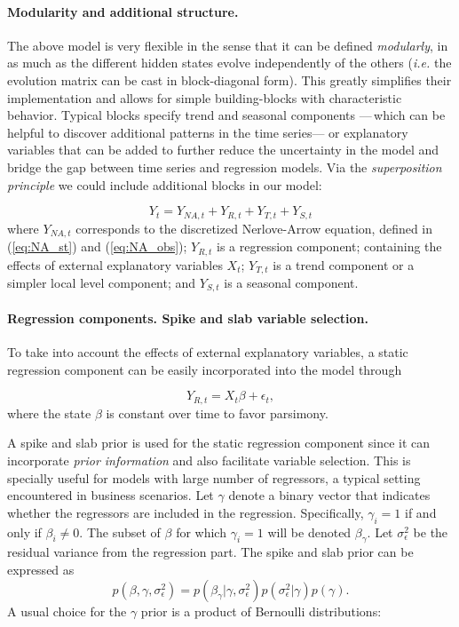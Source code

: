 \paragraph{Modularity and additional structure.}

The above model is very flexible in the sense that it can be defined \emph{modularly},  in as much as the different hidden states evolve independently of the others (\emph{i.e.} the evolution matrix can be cast in block-diagonal form). This greatly simplifies their implementation and allows for simple building-blocks with characteristic behavior. Typical blocks specify trend and seasonal components ---\,which can be helpful to discover additional patterns in the time series--- or explanatory variables that can be added to further reduce the uncertainty in the model and bridge the gap between time series and regression models. Via the \emph{superposition principle} \cite[Chapter 3]{petris2009dynamic} we could include additional blocks in our model:

$$
Y_t = Y_{NA, t} + Y_{R, t} + Y_{T, t} + Y_{S, t}
$$
where $Y_{NA, t}$ corresponds to the discretized Nerlove-Arrow equation, defined in (\ref{eq:NA_st}) and (\ref{eq:NA_obs}); $Y_{R, t}$ is a regression component; containing the effects of  external explanatory variables $X_t$; $Y_{T, t}$ is a trend component or a simpler local level component; and $Y_{S, t}$ is a seasonal component.

\paragraph{Regression components. Spike and slab variable selection.}\label{sec:s_s}

To take into account the effects of external explanatory variables, a static regression component can be easily incorporated into the model through

$$
Y_{R,t} = X_t \beta + \epsilon_t,
$$
where the state $\beta$ is constant over time to favor parsimony.

A spike and slab prior \cite{mitchell1988bayesian} is used for the static regression component since it can incorporate \emph{prior information} and also facilitate variable selection. This is specially useful for models with large number of regressors, a typical setting encountered in business scenarios.
Let $\gamma$ denote a binary vector that indicates whether the regressors are included in the regression. Specifically, $\gamma_i = 1$ if and only if $\beta_i \neq 0$. The subset of $\beta$ for which $\gamma_i = 1$ will be denoted $\beta_{\gamma}$. Let $\sigma^2_{\epsilon}$ be the residual variance from the regression part. The spike and slab prior \cite{george1997approaches} can be expressed as
$$
p(\beta, \gamma, \sigma^2_{\epsilon}) = p(\beta_{\gamma} | \gamma, \sigma^2_{\epsilon})p(\sigma^2_{\epsilon} | \gamma)p(\gamma).
$$
A usual choice for the $\gamma$ prior is a product of Bernoulli distributions:

